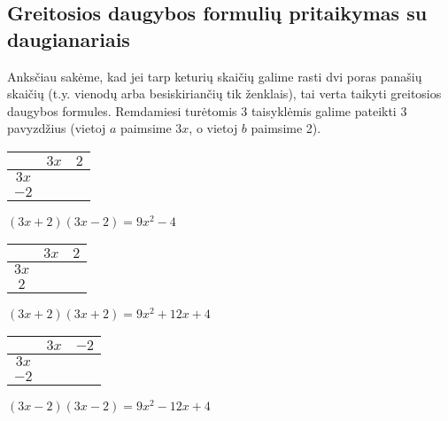 \documentclass[a4paper]{article}
\newcommand{\high}[1]{\cellcolor{orange!80!white}{#1}}
\newcommand{\midd}[1]{\cellcolor{green!50!white}{#1}}
\newcommand{\low}[1]{\cellcolor{blue!50!white}{#1}}
\begin{document}
\subsection{Greitosios daugybos formulių pritaikymas su daugianariais}
Anksčiau sakėme, kad jei tarp keturių skaičių galime rasti dvi poras panašių skaičių (t.y. vienodų arba besiskiriančių tik ženklais), tai verta taikyti greitosios daugybos formules. Remdamiesi turėtomis 3 taisyklėmis galime pateikti 3 pavyzdžius (vietoj $a$ paimsime $3x$, o vietoj $b$ paimsime 2).
\newline\newline
\begin{minipage}[b]{0.3\linewidth}
\begin{center}
\begin{tabular}{c||c|c}
 & $3x$ & $2$ \\ \hline \hline
 $3x$ & \high{$9x^2$} & \midd{$6x$}\\ \hline 
 $-2$ &  \midd{$-6x$}  & \low{$-4$}
\end{tabular}
\newline\newline\newline
$(3x+2)(3x-2) = 9x^2-4$
\end{center}
\end{minipage}
\begin{minipage}[b]{0.3\linewidth}
\begin{center}
\begin{tabular}{c||c|c}
& $3x$ & $2$ \\ \hline \hline
 $3x$ & \high{$9x^2$} & \midd{$6x$}\\ \hline 
 $2$ &  \midd{$6x$}  & \low{$4$}
\end{tabular}
\newline\newline\newline
$(3x+2)(3x+2) = 9x^2+12x+4$
\end{center}
\end{minipage}
\begin{minipage}[b]{0.3\linewidth}
\begin{center}
\begin{tabular}{c||c|c}
& $3x$ & $-2$ \\ \hline \hline
 $3x$ & \high{$9x^2$} & \midd{$-6x$}\\ \hline 
 $-2$ &  \midd{$-6x$}  & \low{$4$}
\end{tabular}
\newline\newline\newline
$(3x-2)(3x-2) = 9x^2-12x+4$
\end{center}
\end{minipage}
\end{document}
